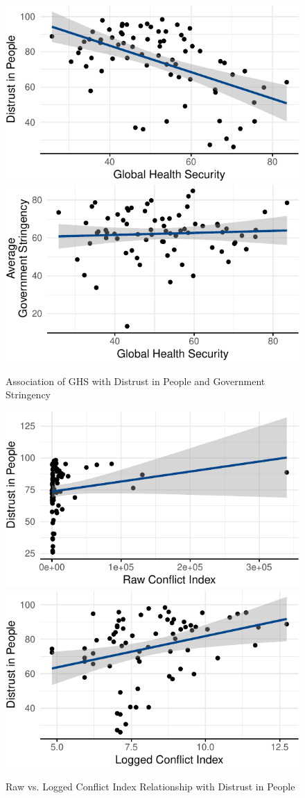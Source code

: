 \documentclass[
  11pt,
]{article}
\begin{document}
\hfill\break
\hfill\break

\begin{figure}
\includegraphics[width=0.48\linewidth]{write_up_test_files/figure-latex/ghs-plots-1} \includegraphics[width=0.48\linewidth]{write_up_test_files/figure-latex/ghs-plots-2} \caption{Association of GHS with Distrust in People and Government Stringency}\label{fig:ghs-plots}
\end{figure}

\begin{figure}
\includegraphics[width=0.48\linewidth]{write_up_test_files/figure-latex/conflict-log-1} \includegraphics[width=0.48\linewidth]{write_up_test_files/figure-latex/conflict-log-2} \caption{Raw vs. Logged Conflict Index Relationship with Distrust in People}\label{fig:conflict-log}
\end{figure}
\end{document}

